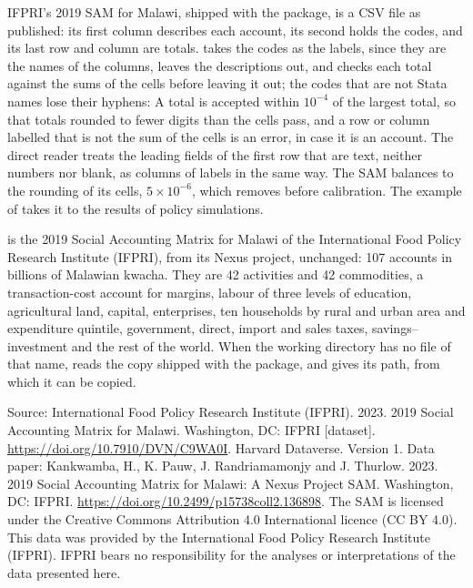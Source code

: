 IFPRI's 2019 SAM for Malawi, shipped with the package, is a CSV file as
published: its first column describes each account, its second holds the
codes, and its last row and column are totals.  takes the codes
as the labels, since they are the names of the columns, leaves the
descriptions out, and checks each total against the sums of the cells before
leaving it out; the codes that are not Stata names lose their hyphens:
A total is accepted within $10^{-4}$ of the largest total, so that totals
rounded to fewer digits than the cells pass, and a row or column labelled
 that is not the sum of the cells is an error, in case it is an
account. The direct reader treats the leading fields of the first row that
are text, neither numbers nor blank, as columns of labels in the same way.
The SAM balances to the rounding of its cells, $5 \times 10^{-6}$, which
 removes before calibration. The example of
 takes it to the results of policy simulations.


 is the 2019 Social Accounting Matrix for Malawi of
the International Food Policy Research Institute (IFPRI), from its Nexus
project, unchanged: 107 accounts in billions of Malawian kwacha. They are 42
activities and 42 commodities, a transaction-cost account for margins,
labour of three levels of education, agricultural land, capital,
enterprises, ten households by rural and urban area and expenditure
quintile, government, direct, import and sales taxes, savings--investment
and the rest of the world. When the working directory has no file of that
name,  reads the copy shipped with the package, and
 gives its path, from which it can be copied.

Source: International Food Policy Research Institute (IFPRI). 2023. 2019
Social Accounting Matrix for Malawi. Washington, DC: IFPRI [dataset].
\url{https://doi.org/10.7910/DVN/C9WA0I}. Harvard Dataverse. Version 1. Data
paper: Kankwamba, H., K. Pauw, J. Randriamamonjy and J. Thurlow. 2023. 2019
Social Accounting Matrix for Malawi: A Nexus Project SAM. Washington, DC:
IFPRI. \url{https://doi.org/10.2499/p15738coll2.136898}. The SAM is licensed
under the Creative Commons Attribution 4.0 International licence (CC BY 4.0).
This data was provided by the International Food Policy Research Institute
(IFPRI). IFPRI bears no responsibility for the analyses or interpretations of
the data presented here.

